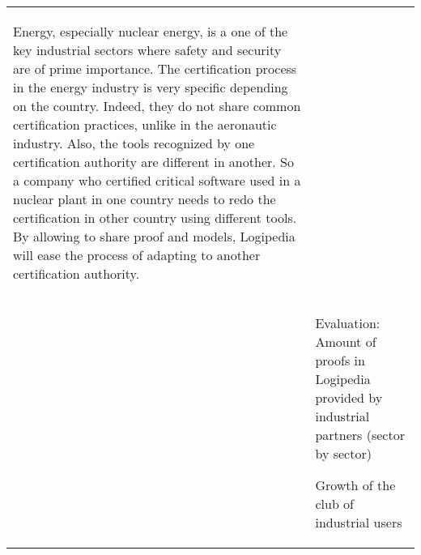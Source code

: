 \begin{longtable}{|p{}|p{}|}
\begin{framed}
Energy, especially nuclear energy, is a one of the key industrial
sectors where safety and security are of prime importance.  The
certification process in the energy industry is very specific
depending on the country. Indeed, they do not share common
certification practices, unlike in the aeronautic industry. Also, the
tools recognized by one certification authority are different in
another. So a company who certified critical software used in a
nuclear plant in one country needs to redo the certification in other
country using different tools. By allowing to share proof and models,
Logipedia will ease the process of adapting to another certification
authority.
\end{framed}\\

&\begin{framed}
   Evaluation: Amount of proofs in Logipedia provided by
   industrial partners (sector by sector)

   Growth of the club of industrial users
 \end{framed}\\


\end{longtable}
